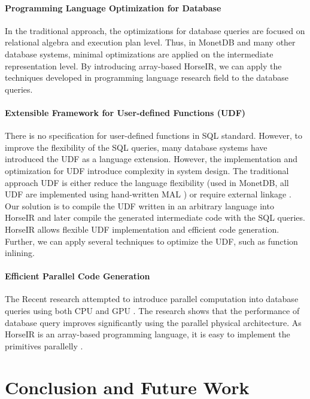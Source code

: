 \documentclass[sigplan]{acmart}
\begin{document}
\paragraph{Programming Language Optimization for Database}
In the traditional approach, the optimizations for database queries are focused
on relational algebra and execution plan level. Thus, in MonetDB and many other
database systems, minimal optimizations are applied on the intermediate
representation level. By introducing array-based HorseIR, we can apply the
techniques developed in programming language research field to the database
queries.

\paragraph{Extensible Framework for User-defined Functions (UDF)}
There is no specification for user-defined functions in SQL standard. However,
to improve the flexibility of the SQL queries, many database systems have
introduced the UDF as a language extension. However, the implementation and
optimization for UDF introduce complexity in system design. The traditional
approach UDF is either reduce the language flexibility (used in MonetDB, all
UDF are implemented using hand-written MAL \cite{MALUDF}) or require external
linkage \cite{ExternUDF}. Our solution is to compile the UDF written in an
arbitrary language into HorseIR and later compile the generated intermediate
code with the SQL queries. HorseIR allows flexible UDF implementation and
efficient code generation. Further, we can apply several techniques to optimize
the UDF, such as function inlining.

\paragraph{Efficient Parallel Code Generation}
The Recent research attempted to introduce parallel computation into database
queries using both CPU\cite{DBLP:conf/sigmod/PolychroniouRR15}
\cite{DBLP:conf/sigmod/ZhouR02} and GPU \cite{DBLP:conf/ica3pp/CremerBMM16}.
The research shows that the performance of database query improves
significantly using the parallel physical architecture. As HorseIR is an
array-based programming language, it is easy to implement the primitives
parallelly \cite{DBLP:conf/pldi/ImamSLK14}. 

\section{Conclusion and Future Work}
\end{document}

